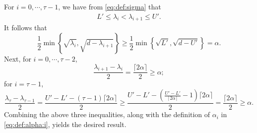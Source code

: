 \documentclass[onecolumn,letterpaper]{IEEEtran}
\newcommand{\up}{{U}}
\newcommand{\lw}{{L}}
\newcommand{\ap}{{\alpha}}
\newcommand{\exi}{{i}}
\newcommand{\sig}{{\lambda}}
\newcommand{\sigi}{{\sig_{\exi}}}
\newcommand{\sigio}{{\sig_{\exi+1}}}
\newcommand{\sigt}{{\sig_{\ta}}}
\newcommand{\sigto}{{\sig_{\ta-1}}}
\newcommand{\ta}{{\tau}}
\newcommand{\alp}{{\ap}}
\newcommand{\alpi}{{\alp_{\exi}}}
\begin{document}
\begin{IEEEproof}
For $\exi = 0,\cdots, \ta-1$, we have from \eqref{eq:def:sigma} that 
\begin{align}
\label{eq:sigi:lu}
    \lw' \le \sigi < \sigio \le \up'.
\end{align} 
It follows that
\begin{equation}
\label{eq:aphi:second-thrid}
    \frac{1}{2} \min\left\{ \sqrt{\sigi} , \sqrt{d-\sigio} \right\} \ge \frac{1}{2} \min\left\{ \sqrt{\lw'} , \sqrt{d-\up'}\right \} = \alp.
\end{equation}
Next,  for $\exi = 0,\cdots, \ta-2$, 
\begin{equation}
\label{eq:aphi:first:tau-1}
    \frac{\sigio-\sigi}{2} = \frac{\lceil2\alp\rceil}{2} \ge \alp;
\end{equation}
for $\exi = \ta-1$, 
\begin{equation}
\label{eq:aphi:first:tau}
    \frac{\sigt-\sigto}{2} = \frac{\up'-\lw'-(\ta-1)\lceil2\alp\rceil}{2} \ge \frac{\up'-\lw' - \left( \frac{\up'-\lw'}{\lceil2\alp\rceil}-1 \right) \lceil2\alp\rceil}{2} = \frac{\lceil2\alp\rceil}{2} \ge \alp.
\end{equation}
Combining the above three inequalities, along with the definition of $\alpi$ in \eqref{eq:def:alpha:i}, yields the desired result.
\end{IEEEproof}
\end{document}

